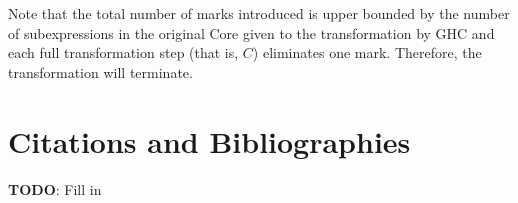 \documentclass[sigplan,screen]{acmart}
\providecommand\BibTeX{{%
    \normalfont B\kern-0.5em{\scshape i\kern-0.25em b}\kern-0.8em\TeX}}}
\begin{document}
Note that the total number of marks introduced is upper bounded by the number of
subexpressions in the original Core given to the transformation by GHC and each
full transformation step (that is, $C$) eliminates one mark. Therefore, the
transformation will terminate.


\clearpage
\section{Citations and Bibliographies}


\begin{tcolorbox}
  \textbf{TODO}: Fill in
\end{tcolorbox}


%   
%   

\end{document}
